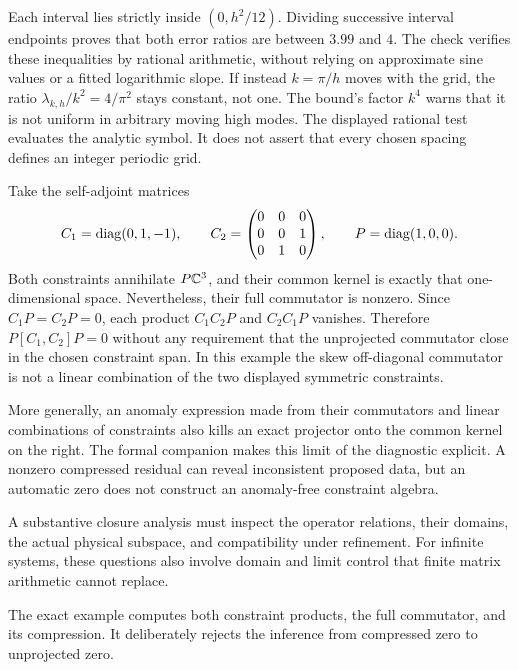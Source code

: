 Each interval lies strictly inside $(0,h^2/12)$. Dividing successive interval endpoints proves that both error ratios are between $3.99$ and $4$. The check verifies these inequalities by rational arithmetic, without relying on approximate sine values or a fitted logarithmic slope.
If instead $k=\pi/h$ moves with the grid, the ratio $\lambda_{k,h}/k^2=4/\pi^2$ stays constant, not one. The bound's factor $k^4$ warns that it is not uniform in arbitrary moving high modes. The displayed rational test evaluates the analytic symbol. It does not assert that every chosen spacing defines an integer periodic grid.

Take the self-adjoint matrices
\[
C_1=\operatorname{diag}(0,1,-1),\qquad
C_2=\begin{pmatrix}0&0&0\\0&0&1\\0&1&0\end{pmatrix},\qquad
P=\operatorname{diag}(1,0,0).
\]
Both constraints annihilate $P\CC^3$, and their common kernel is exactly that one-dimensional space. Nevertheless, their full commutator is nonzero.
Since $C_1P=C_2P=0$, each product $C_1C_2P$ and $C_2C_1P$ vanishes. Therefore $P[C_1,C_2]P=0$ without any requirement that the unprojected commutator close in the chosen constraint span. In this example the skew off-diagonal commutator is not a linear combination of the two displayed symmetric constraints.

More generally, an anomaly expression made from their commutators and linear combinations of constraints also kills an exact projector onto the common kernel on the right. The formal companion makes this limit of the diagnostic explicit. A nonzero compressed residual can reveal inconsistent proposed data, but an automatic zero does not construct an anomaly-free constraint algebra.

A substantive closure analysis must inspect the operator relations, their domains, the actual physical subspace, and compatibility under refinement. For infinite systems, these questions also involve domain and limit control that finite matrix arithmetic cannot replace.

The exact example computes both constraint products, the full commutator, and its compression. It deliberately rejects the inference from compressed zero to unprojected zero.

